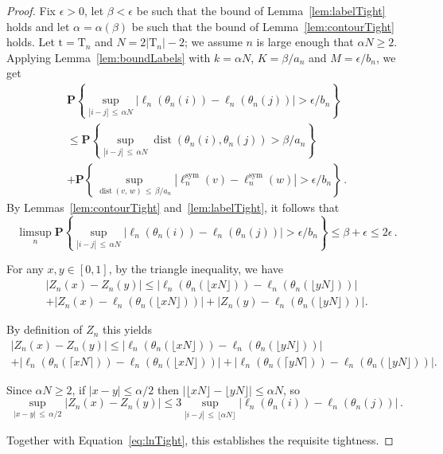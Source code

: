 \documentclass[10pt]{amsart}
\theoremstyle{definition}\newtheorem{defi}[theo]{Definition}\newtheorem{rema}[theo]{Remark}\newtheorem{exam}[theo]{Example}\newtheorem{exem}[theo]{Example}\newtheorem{nota}[theo]{Notation}
\newcommand{\rT}{\mathrm{T}}
\newcommand{\rt}{\mathrm{t}}
\DeclareMathOperator{\sym}{sym}
\DeclareMathOperator{\dist}{dist}
\newcommand{\p}[1]{\mathbf{P}\left\{#1\right\}}
\providecommand{\eps}{}
\renewcommand{\eps}{\epsilon}
\begin{document}
\begin{proof}
Fix $\epsilon>0$, let $\beta<\eps$ be such that the bound of Lemma~\ref{lem:labelTight} holds and let $\alpha = \alpha(\beta)$ be such that the bound of Lemma~\ref{lem:contourTight} holds. Let $\rt=\rT_n$ and $N=2|\rT_n|-2$; we assume $n$ is large enough that $\alpha N \ge 2$. Applying Lemma~\ref{lem:boundLabels} with $k=\alpha N$, $K= \beta/a_n$ and $M=\epsilon/b_n$, we get
\begin{multline*}
\p{\sup_{|i-j|\,\le\,\alpha N} \left|\ell_n(\theta_n(i)) -\ell_n(\theta_n(j))\right| > \epsilon/b_n}\\
\le
\p{\sup_{|i-j|\,\le\,\alpha N} \dist(\theta_n(i),\theta_n(j)) > \beta/a_n}\\
+\p{
\sup_{\dist(v,\,w)\,\le\,\beta/a_n} \left|\ell_n^{\sym}(v) - \ell_n^{\sym}(w)\right| > \epsilon/b_n}\,.
\end{multline*}
By Lemmas~\ref{lem:contourTight} and~\ref{lem:labelTight}, it follows that
\begin{equation}\label{eq:lnTight}
\limsup_n \p{\sup_{|i-j|\,\le\,\alpha N} \left|\ell_n(\theta_n(i)) -\ell_n(\theta_n(j))\right| > \epsilon/b_n} \le \beta + \epsilon \le 2\epsilon\,.
\end{equation}


For any $x,y \in [0,1]$, by the triangle inequality, we have
\begin{multline*}
\left|Z_n(x)-Z_n(y)\right| \le \left|\ell_n(\theta_n(\lfloor xN\rfloor))-\ell_n(\theta_n(\lfloor yN\rfloor))\right|\\
+\left|Z_n(x)-\ell_n(\theta_n(\lfloor xN\rfloor))\right|+\left|Z_n(y)-\ell_n(\theta_n(\lfloor yN\rfloor))\right|.
\end{multline*}


By definition of $Z_n$ this yields
\begin{multline*}
\left|Z_n(x)-Z_n(y)\right| \le \left|\ell_n(\theta_n(\lfloor xN\rfloor))-\ell_n(\theta_n(\lfloor yN\rfloor))\right|\\
+\left|\ell_n(\theta_n(\lceil xN\rceil))-\ell_n(\theta_n(\lfloor xN\rfloor))\right|+\left|\ell_n(\theta_n(\lceil yN\rceil))-\ell_n(\theta_n(\lfloor yN\rfloor))\right|.
\end{multline*}


Since $\alpha N \ge 2$, if $|x-y| \le \alpha/2$ then $|\lfloor x N \rfloor - \lfloor y N \rfloor| \le \alpha N$, so
\[
\sup_{|x-y|\,\le\,\alpha/2}\left|Z_n(x)-Z_n(y)\right| \le 3 \sup_{|i-j|\,\le\,\lfloor \alpha N\rfloor} \left|\ell_n(\theta_n(i)) -\ell_n(\theta_n(j))\right|\,.
\]

Together with Equation~\eqref{eq:lnTight}, this establishes the requisite tightness.
\end{proof}
\end{document}
